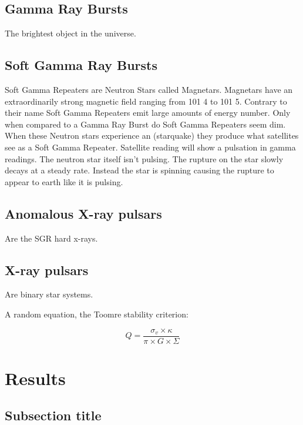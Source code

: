 \documentclass[final,5p,times,twocolumn,authoryear]{elsarticle}
\begin{document}
\subsection{Gamma Ray Bursts}

The brightest object in the universe.



\subsection{Soft Gamma Ray Bursts}

Soft Gamma Repeaters are Neutron Stars called Magnetars. Magnetars have an extraordinarily strong magnetic field ranging from 101 4 to 101 5. Contrary to their name Soft Gamma Repeaters emit large amounts of energy number. Only when compared to a Gamma Ray Burst do Soft Gamma Repeaters seem dim. When these Neutron stars experience an (starquake) they produce what satellites see as a Soft Gamma Repeater. Satellite reading will show a pulsation in gamma readings. The neutron star itself isn’t pulsing. The rupture on the star slowly decays at a steady rate. Instead the star is spinning causing the rupture to appear to earth like it is pulsing.

\subsection{Anomalous X-ray pulsars}

Are the SGR hard x-rays.



\subsection{X-ray pulsars}

Are binary star systems.

A random equation, the Toomre stability criterion:

\begin{equation}
    Q = \frac{\sigma_v \times \kappa}{\pi \times G \times \Sigma}
\end{equation}

\section{Results}
\lipsum[2]

\subsection{Subsection title}
\lipsum[3]
\end{document}
